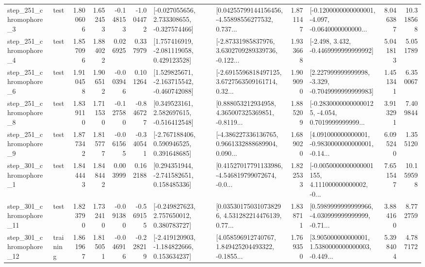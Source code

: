 \begin{tabular}{llrrrrllrlrr}
   step\_251\_chromophore\_3 &      test &      1.800606 &    1.652453 &     -0.148153 & -1.004472 &   [-0.027055656, 2.733308655, -0.327574466] &  [0.04255799144156456, -4.55898556277532, 0.737... &       1.871147 &  [-0.1200000000000001, -4.097, -0.0640000000000... &            8.046387 &         10.318568 \\
   step\_251\_chromophore\_4 &      test &      1.857096 &    1.884022 &      0.026925 &  0.337979 &    [1.757416919, -2.081119058, 0.429123528] &  [-2.87331985837976, 3.6302709289339736, -0.122... &       1.933668 &               [-2.498, 3.432, -0.4469999999999992] &            5.041813 &          5.051789 \\
   step\_251\_chromophore\_6 &      test &      1.910458 &    1.906512 &     -0.003946 &  0.101264 &   [1.529825671, -2.163715542, -0.460742088] &  [-2.6915596818497125, 3.6727563509161714, 0.32... &       1.909090 &   [2.227999999999998, -3.329, -0.7049999999999983] &            1.451341 &          6.350067 \\
   step\_251\_chromophore\_8 &      test &      1.839110 &    1.711530 &     -0.127580 & -0.846727 &    [0.349523161, 2.582697615, -0.516412548] &  [0.888053212934958, 4.365007325369851, -0.8119... &       1.885209 &  [-0.28300000000000125, -4.054, 0.7019999999999... &            3.913291 &          7.409844 \\
   step\_251\_chromophore\_9 &      test &      1.877342 &    1.815777 &     -0.061565 & -0.340541 &    [-2.767188406, 0.590946525, 0.391648685] &  [-4.386227336136765, 0.9661332888689904, 0.090... &       1.689020 &  [4.091000000000001, -0.9830000000000001, -0.14... &            6.095240 &          1.355120 \\
   step\_301\_chromophore\_1 &      test &      1.844443 &    1.848442 &      0.003999 &  0.162188 &    [0.294351944, -2.741582651, 0.158485336] &  [0.41527017791133986, -4.546819799072674, -0.0... &       1.822533 &  [-0.0050000000000001155, 4.111000000000002, -0... &            7.651547 &         10.159598 \\
  step\_301\_chromophore\_11 &      test &      1.823790 &    1.732410 &     -0.091380 & -0.569155 &    [-0.249827623, 2.757650012, 0.380783727] &  [0.035301750310738296, 4.531282214476139, 0.77... &       1.838711 &  [0.5989999999999966, -4.030999999999999, -0.71... &            3.884160 &          8.772759 \\
  step\_301\_chromophore\_12 &  training &      1.861967 &    1.815051 &     -0.046916 & -0.228219 &   [-2.419120903, -1.184822666, 0.153634237] &  [4.058596912740767, 1.849425204493322, -0.1855... &       1.769350 &  [3.905000000000001, 1.5380000000000003, -0.449... &            5.398404 &          4.787172 \\

\end{tabular}
